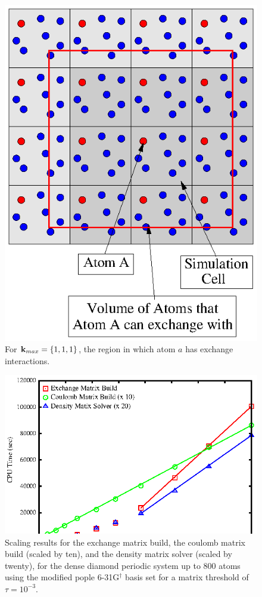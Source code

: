 \documentclass[prb,aps,nobibnotes,twocolumn,doublespace,twocolumngrid,superbib]{revtex4}
\begin{document}
\begin{figure}
\caption{For ${\bf k}_{max}=\{1,1,1\}$, the region in which atom $a$ has exchange interactions.}
\label{figure:ExchangeRegion_k111}
{\centering \includegraphics{ExchangeRegion_k111.ps} \par}
\end{figure}
%
%
%
\begin{figure}
\caption{Scaling results for the exchange matrix build, the coulomb matrix
build (scaled by ten), and the density matrix solver (scaled by twenty),  
for the dense diamond periodic system up to 800 atoms using the modified pople
6-31G$ ^\dagger$ basis set for a matrix threshold of $\tau=10^{-3}$.}
\label{figure:Scaling_Matrix_Build}
{\centering \includegraphics{Timing_Diamond_ONX.ps} \par} 
\end{figure}
\end{document}
